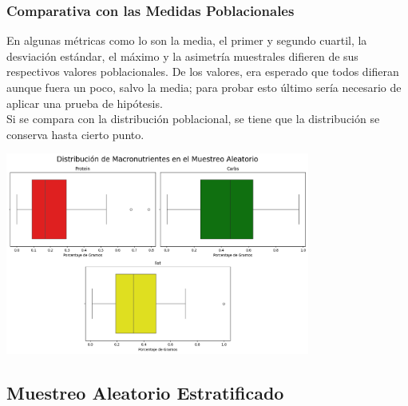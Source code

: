 \documentclass[12pt,a4paper]{article}
\begin{document}
    \subsubsection{Comparativa con las Medidas Poblacionales}
        En algunas métricas como lo son la media, el primer y segundo cuartil, 
        la desviación estándar, el máximo y la asimetría muestrales 
        difieren de sus respectivos valores poblacionales. De los valores, era 
        esperado que todos difieran aunque fuera un poco, salvo la media; para 
        probar esto último sería necesario de aplicar una prueba de hipótesis.\\
        Si se compara con la distribución poblacional, se tiene que la 
        distribución se conserva hasta cierto punto.
        \begin{center}
            \includegraphics[width=0.75\textwidth]{Resources/3_01_plot_01.png}
        \end{center}
    
    \subsection{Muestreo Aleatorio Estratificado}
\end{document}

